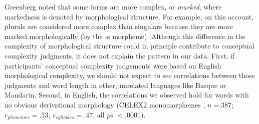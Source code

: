 \documentclass[12pt]{article}
\begin{document}


Greenberg\cite{greenberg1966} noted that some forms are more complex, or \emph{marked}, where markedness is denoted by morphological structure. For example, on this account, plurals are considered more complex than singulars because they are more marked morphologically (by the -s morpheme). Although this difference in the complexity of morphological structure could in principle contribute to conceptual complexity judgments, it does not explain the pattern in our data. First, if participants' conceptual complexity judgements were based on English morphological complexity, we should not expect to see correlations between those judgments and word length in other, unrelated languages like Basque or Mandarin. Second, in English, the correlations we observed hold for words with no obvious derivational morphology (CELEX2 monomorphemes \cite{baayen1995celex2}, $n = 387$; $r_{phonemes} = .53$, $r_{syllables} = .47$, all $p$s $< .0001$). 

\end{document}
